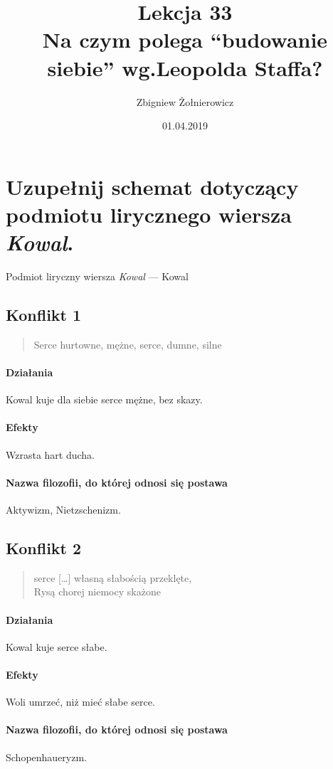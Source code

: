 \documentclass{article}
\begin{document}
\title{
        {\huge Lekcja 33} \\
        {\large Na czym polega ``budowanie siebie'' wg.\@ Leopolda Staffa?}
}
\author{Zbigniew Żołnierowicz}
\date{01.04.2019}
\maketitle
\section{Uzupełnij schemat dotyczący podmiotu lirycznego wiersza \emph{Kowal}.}
\large{Podmiot liryczny wiersza \emph{Kowal} --- Kowal}
\normalsize
\subsection{Konflikt 1}
\begin{quote}
        Serce hurtowne, mężne, serce, dumne, silne
\end{quote}
\paragraph*{Działania}
Kowal kuje dla siebie serce mężne, bez skazy.
\paragraph*{Efekty}
Wzrasta hart ducha.
\paragraph*{Nazwa filozofii, do której odnosi się postawa} Aktywizm, Nietzschenizm.
\subsection{Konflikt 2}
\begin{quote}
        serce [\dots] własną słabością przeklęte, \\
        Rysą chorej niemocy skażone
\end{quote}
\paragraph*{Działania}
Kowal kuje serce słabe.
\paragraph*{Efekty}
Woli umrzeć, niż mieć słabe serce.
\paragraph*{Nazwa filozofii, do której odnosi się postawa}
Schopenhaueryzm.
\end{document}
